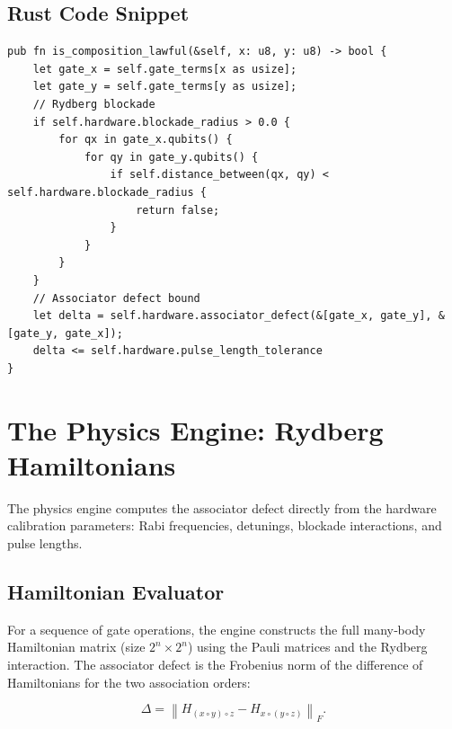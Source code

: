 \documentclass[11pt]{article}
\begin{document}
\subsection{Rust Code Snippet}
\begin{lstlisting}[style=rust, caption={Lawfulness check in the completion kernel}]
pub fn is_composition_lawful(&self, x: u8, y: u8) -> bool {
    let gate_x = self.gate_terms[x as usize];
    let gate_y = self.gate_terms[y as usize];
    // Rydberg blockade
    if self.hardware.blockade_radius > 0.0 {
        for qx in gate_x.qubits() {
            for qy in gate_y.qubits() {
                if self.distance_between(qx, qy) < self.hardware.blockade_radius {
                    return false;
                }
            }
        }
    }
    // Associator defect bound
    let delta = self.hardware.associator_defect(&[gate_x, gate_y], &[gate_y, gate_x]);
    delta <= self.hardware.pulse_length_tolerance
}
\end{lstlisting}

\section{The Physics Engine: Rydberg Hamiltonians}

The physics engine computes the associator defect directly from the hardware calibration parameters: Rabi frequencies, detunings, blockade interactions, and pulse lengths.

\subsection{Hamiltonian Evaluator}
For a sequence of gate operations, the engine constructs the full many‐body Hamiltonian matrix (size \(2^n \times 2^n\)) using the Pauli matrices and the Rydberg interaction. The associator defect is the Frobenius norm of the difference of Hamiltonians for the two association orders:

\[
\Delta = \left\| H_{(x\circ y)\circ z} - H_{x\circ (y\circ z)} \right\|_F.
\]
\end{document}
